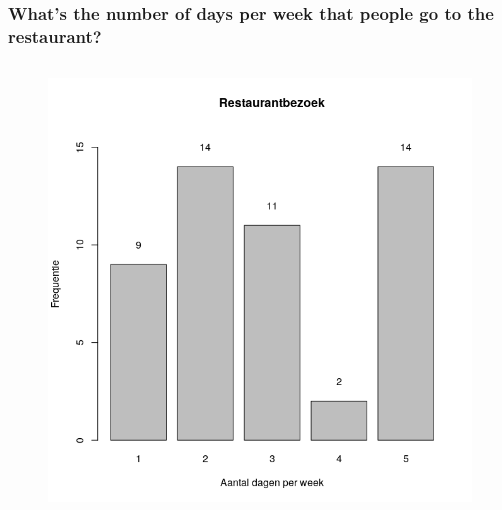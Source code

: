 \documentclass{beamer}
\begin{document}
\begin{frame}
\begin{columns}
\begin{column}{0.5\textwidth}
    \end{column}
  \end{columns}
\end{frame}

\begin{frame}
  \frametitle{What's the number of days per week that people go to the restaurant?}
  \begin{columns}
    
    \begin{column}{0.5\textwidth}
      \begin{figure}
        \centering
        \includegraphics[width=1.00\textwidth]{img/2var-barplot-aantalbezoeken}
      \end{figure}
    \end{column}
  

\end{columns}
\end{frame}
\end{document}
